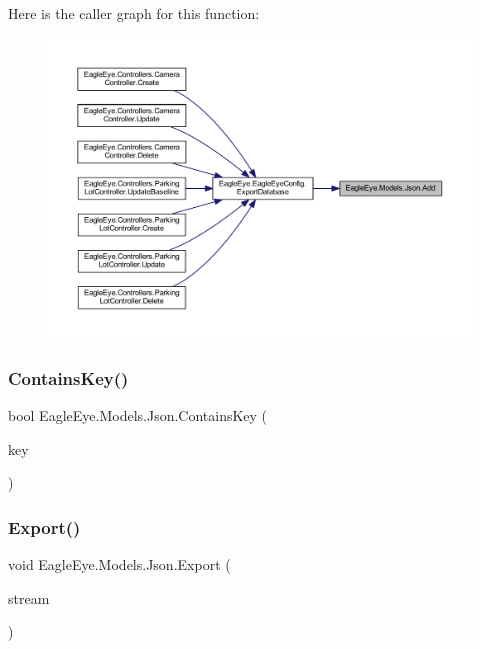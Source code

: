 Here is the caller graph for this function\+:\nopagebreak
\begin{figure}[H]
\begin{center}
\leavevmode
\includegraphics[width=350pt]{class_eagle_eye_1_1_models_1_1_json_a4b23b3ec238276219d3d953b385fac93_icgraph}
\end{center}
\end{figure}
\mbox{\label{class_eagle_eye_1_1_models_1_1_json_a140f24f32b5b39c66584f13eb2fbf586}} 
\subsubsection{\texorpdfstring{ContainsKey()}{ContainsKey()}}
{\footnotesize\ttfamily bool Eagle\+Eye.\+Models.\+Json.\+Contains\+Key (\begin{DoxyParamCaption}\item[{string}]{key }\end{DoxyParamCaption})}





\mbox{\label{class_eagle_eye_1_1_models_1_1_json_ad911e1ca9e6ba8a8ae4c85152593c691}} 
\subsubsection{\texorpdfstring{Export()}{Export()}}
{\footnotesize\ttfamily void Eagle\+Eye.\+Models.\+Json.\+Export (\begin{DoxyParamCaption}\item[{Stream\+Writer}]{stream }\end{DoxyParamCaption})}





